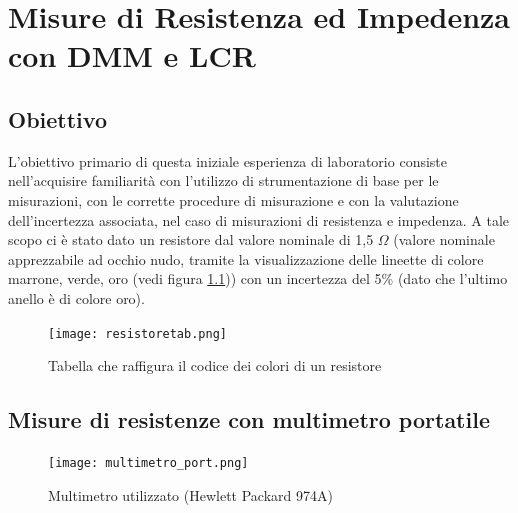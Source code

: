 \chapter{Misure di Resistenza ed Impedenza con DMM e LCR}
\label{chap:prima_prova}


\section*{Obiettivo}
\label{sec:ob_first}

L'obiettivo primario di questa iniziale esperienza di laboratorio consiste nell'acquisire familiarità con l'utilizzo di strumentazione di base per le misurazioni, con le corrette procedure di misurazione e con la valutazione dell'incertezza associata, nel caso di misurazioni di resistenza e impedenza.
\newline \newline
A tale scopo ci è stato dato un resistore dal valore nominale di 1,5 $\Omega$ (valore nominale apprezzabile ad occhio nudo, tramite la visualizzazione delle lineette di colore marrone, verde, oro (vedi figura \ref{fig:resistore})) con un incertezza del 5\% (dato che l'ultimo anello è di colore oro).

\begin{figure}[h]
    \centering
    \texttt{[image: resistoretab.png]}
    \caption{Tabella che raffigura il codice dei colori di un resistore}
    \label{fig:resistore}
\end{figure}
\FloatBarrier














\section{Misure di resistenze con multimetro portatile}
\label{sec:mult_port}

\begin{figure}[h]
    \centering
    \texttt{[image: multimetro\_port.png]}
    \caption{Multimetro utilizzato (Hewlett Packard 974A)}
    \label{fig:multimetro_port}
\end{figure}
\FloatBarrier

